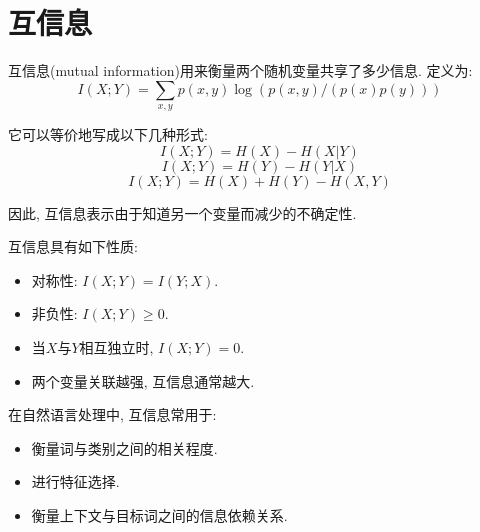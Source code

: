 \section{互信息}


互信息(mutual information)用来衡量两个随机变量共享了多少信息. 定义为:
\[
I(X;Y) = \sum_{x,y} p(x,y) \log (p(x,y)/(p(x) p(y)))
\]

它可以等价地写成以下几种形式:
\[
I(X;Y) = H(X) - H(X|Y)
\]
\[
I(X;Y) = H(Y) - H(Y|X)
\]
\[
I(X;Y) = H(X) + H(Y) - H(X,Y)
\]

因此, 互信息表示由于知道另一个变量而减少的不确定性.

互信息具有如下性质:

\begin{itemize}
\item 对称性: $I(X;Y)=I(Y;X)$.
\item 非负性: $I(X;Y) \ge 0$.
\item 当$X$与$Y$相互独立时, $I(X;Y)=0$.
\item 两个变量关联越强, 互信息通常越大.
\end{itemize}

在自然语言处理中, 互信息常用于:

\begin{itemize}
\item 衡量词与类别之间的相关程度.
\item 进行特征选择.
\item 衡量上下文与目标词之间的信息依赖关系.
\end{itemize}
